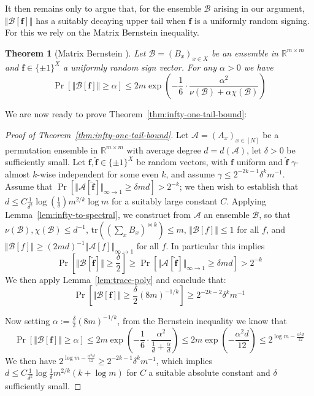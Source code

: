 \documentclass[11pt]{article}
\newtheorem{theorem}{Theorem}
\newcommand{\norm}[1]{\Vert #1 \Vert}
\newcommand{\bhat}[1]{\bm{\hat{#1}}}
\newcommand{\N}{[N]}
\begin{document}
It then remains only to argue that, for the ensemble $\mathcal{B}$ arising in our argument, $\norm{\mathcal{B}[\bm{f}]}$ has a suitably decaying upper tail when $\bm{f}$ is a uniformly random signing. For this we rely on the Matrix Bernstein inequality. 
\begin{theorem}[Matrix Bernstein \cite{tropp}]
Let $\mathcal{B}=(B_x)_{x \in X}$ be an ensemble in $\mathbb{R}^{m \times m}$ and $\bm{f} \in \{\pm 1\}^X$ a uniformly random sign vector. For any $\alpha > 0$ we have
\[
\Pr[\norm{\mathcal{B}[\bm{f}]} \geq \alpha ] \leq 2m \exp (-\frac{1}{6} \cdot \frac{\alpha ^2}{\nu(\mathcal{B}) + \alpha \chi(\mathcal{B}) })
\]
\end{theorem}

We are now ready to prove Theorem~\ref{thm:infty-one-tail-bound}:
\begin{proof}[Proof of Theorem~\ref{thm:infty-one-tail-bound}]
Let $\mathcal{A} = (A_x)_{x \in \N}$ be a permutation ensemble in $\mathbb{R}^{m \times m}$ with average degree $d=d(\mathcal{A})$, let $\delta > 0$ be sufficiently small. Let $\bm{f}, \bhat{f} \in \{\pm 1\}^X$ be random vectors, with $\bm{f}$ uniform and $\bhat{f}$ $\gamma$-almost $k$-wise independent for some even $k$, and assume $\gamma \leq 2^{-2k - 1} \delta^k m^{-1}$. Assume that $\Pr[\norm{\mathcal{A}[\bhat{f}]}_{\infty\to 1} \geq \delta md ]> 2^{-k}$; we then wish to establish that $d \leq   C\frac{1}{\delta^2} \log(\frac{1}{\delta}) m^{2/k}\log m $ for a suitably large constant $C$.
Applying Lemma~\ref{lem:infty-to-spectral}, we construct from $\mathcal{A}$ an ensemble $\mathcal{B}$, so that $\nu(\mathcal{B}),\chi(\mathcal{B}) \leq d^{-1}$, $\mathrm{tr}((\sum_x B_x)^{\bowtie k})\leq m$, $\norm{\mathcal{B}[f]} \leq 1$ for all $f$, and $\norm{\mathcal{B}[f]} \geq (2md)^{-1} \norm{\mathcal{A}[f]}_{\infty\to 1}$ for all $f$. In particular this implies
\[
\Pr[\norm{\mathcal{B}[\bhat{f}]} \geq \frac{\delta}{2} ] \geq  \Pr[ \norm{\mathcal{A}[\bhat{f}]}_{\infty\to 1} \geq \delta md]   > 2^{-k}
\]
We then apply Lemma~\ref{lem:trace-poly} and conclude that:
\[
\Pr[\norm{\mathcal{B}[\bm{f}]} \geq \frac{\delta}{2} (8m)^{-1/k}] \geq 2^{-2k-2} \delta^k m^{-1} 
\]

Now setting $\alpha:= \frac{\delta}{2} (8m)^{-1/k}$, from the Bernstein inequality we know that
\[
 \Pr[\norm{\mathcal{B}[\bm{f}]} \geq \alpha ] \leq 2m \exp(-\frac{1}{6} \cdot \frac{\alpha^2}{\frac{1}{d} + \frac{\alpha}{d}}) \leq 2m \exp (-\frac{\alpha^2 d}{12}) \leq 2^{\log m - \frac{\alpha^2d}{12}}
\]
We then have $2^{\log m - \frac{\alpha^2 d}{12}} \geq 2^{-2k-1} \delta^k m^{-1} $,
which implies $d \leq C\frac{1}{\delta^2} \log \frac{1}{\delta} m^{2/k} (k + \log m)$ for $C$ a suitable absolute constant and $\delta$ sufficiently small.
\end{proof}
\end{document}

